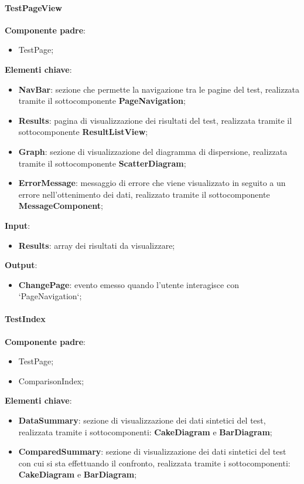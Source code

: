 \paragraph{TestPageView}
\textbf{Componente padre}:
\begin{itemize}
    \item TestPage;
\end{itemize}
\textbf{Elementi chiave}:
\begin{itemize}
    \item \textbf{NavBar}: sezione che permette la navigazione tra le pagine del test, realizzata tramite il sottocomponente \textbf{PageNavigation};
    \item \textbf{Results}: pagina di visualizzazione dei risultati del test, realizzata tramite il sottocomponente \textbf{ResultListView};
    \item \textbf{Graph}: sezione di visualizzazione del diagramma di dispersione, realizzata tramite il sottocomponente \textbf{ScatterDiagram};
    \item \textbf{ErrorMessage}: messaggio di errore che viene visualizzato in seguito a un errore nell'ottenimento dei dati, realizzato tramite il sottocomponente \textbf{MessageComponent};
\end{itemize}
\textbf{Input}:
\begin{itemize}
    \item \textbf{Results}: array dei risultati da visualizzare;
\end{itemize}
\textbf{Output}:
\begin{itemize}
    \item \textbf{ChangePage}: evento emesso quando l'utente interagisce con `PageNavigation`;
\end{itemize}
\paragraph{TestIndex}
\textbf{Componente padre}:
\begin{itemize}
    \item TestPage;
    \item ComparisonIndex;
\end{itemize}
\textbf{Elementi chiave}:
\begin{itemize}
    \item \textbf{DataSummary}: sezione di visualizzazione dei dati sintetici del test, realizzata tramite i sottocomponenti: \textbf{CakeDiagram} e \textbf{BarDiagram};
    \item \textbf{ComparedSummary}: sezione di visualizzazione dei dati sintetici del test con cui si sta effettuando il confronto, realizzata tramite i sottocomponenti: \textbf{CakeDiagram} e \textbf{BarDiagram};
\end{itemize}

